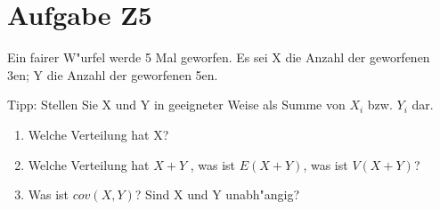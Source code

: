 \section{Aufgabe Z5}

Ein fairer W"urfel werde 5 Mal geworfen. Es sei
\newline
X die Anzahl der geworfenen 3en;
\newline
Y die Anzahl der geworfenen 5en.
\newline

\noindent Tipp: Stellen Sie X und Y in geeigneter Weise als Summe von $X_{i}$
bzw. $Y_{i}$ dar.

\begin{enumerate}[leftmargin=1cm, label=\alph*)]
	\item Welche Verteilung hat X?
	\newpage
	\item Welche Verteilung hat $X + Y$ , was ist $E(X + Y )$, was ist $V(X + Y )$?
	\vspace{12cm}
	\item Was ist $cov(X , Y )$? Sind X und Y unabh"angig?
\end{enumerate}




